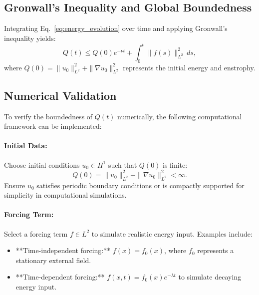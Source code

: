 \documentclass[12pt]{article}
\theoremstyle{definition}
\begin{document}
\subsection{Gronwall’s Inequality and Global Boundedness}
Integrating Eq.~\eqref{eq:energy_evolution} over time and applying Gronwall’s inequality yields:
\begin{equation}
Q(t) \leq Q(0) e^{-\nu t} + \int_0^t \|f(s)\|_{L^2}^2 \, ds,
\label{eq:qt_boundedness}
\end{equation}
where $Q(0) = \|u_0\|_{L^2}^2 + \|\nabla u_0\|_{L^2}^2$ represents the initial energy and enstrophy.

\subsection{Numerical Validation}
To verify the boundedness of $Q(t)$ numerically, the following computational framework can be implemented:

\paragraph{Initial Data:} Choose initial conditions $u_0 \in H^1$ such that $Q(0)$ is finite:
\begin{equation}
Q(0) = \|u_0\|_{L^2}^2 + \|\nabla u_0\|_{L^2}^2 < \infty.
\end{equation}
Ensure $u_0$ satisfies periodic boundary conditions or is compactly supported for simplicity in computational simulations.

\paragraph{Forcing Term:} Select a forcing term $f \in L^2$ to simulate realistic energy input. Examples include:
\begin{itemize}
    \item **Time-independent forcing:** $f(x) = f_0(x)$, where $f_0$ represents a stationary external field.
    \item **Time-dependent forcing:** $f(x, t) = f_0(x) e^{-\lambda t}$ to simulate decaying energy input.
\end{itemize}
\end{document}
